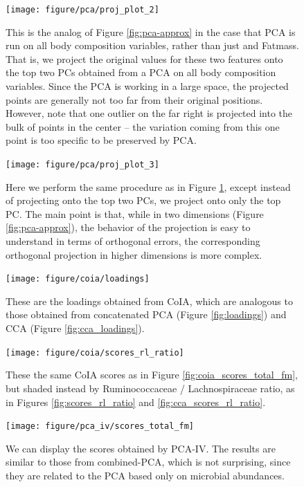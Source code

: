 \documentclass{article}
\begin{document}
\begin{figure}
  \texttt{[image: figure/pca/proj\_plot\_2]}
  \caption{This is the analog of Figure \ref{fig:pca-approx} in the case that
    PCA is run on all body composition variables, rather than just  and
    Fatmass. That is, we project the original values for these two features
    onto the top two PCs obtained from a PCA on all body composition variables.
    Since the PCA is working in a large space, the projected points are
    generally not too far from their original positions. However, note that one
    outlier on the far right is projected into the bulk of points in the center
    -- the variation coming from this one point is too specific to be preserved
    by PCA.
  \label{fig:pca-approx-2}}
\end{figure}

\begin{figure}
  \texttt{[image: figure/pca/proj\_plot\_3]}
  \caption{Here we perform the same procedure as in Figure
    \ref{fig:pca-approx-2}, except instead of projecting onto the top two PCs,
    we project onto only the top PC. The main point is that, while in two
    dimensions (Figure \ref{fig:pca-approx}), the behavior of the projection is
    easy to understand in terms of orthogonal errors, the corresponding
    orthogonal projection in higher dimensions is more complex.
  \label{fig:pca-approx-3}}
\end{figure}

\begin{figure}[ht]
  \centering \texttt{[image: figure/coia/loadings]}
  \caption{These are the loadings obtained from CoIA, which are analogous to
    those obtained from concatenated PCA (Figure \ref{fig:loadings}) and CCA
    (Figure \ref{fig:cca_loadings}). \label{fig:coia_loadings} }
\end{figure}

\begin{figure}[ht]
  \centering
  \texttt{[image: figure/coia/scores\_rl\_ratio]}
  \caption{These the same CoIA scores as in Figure \ref{fig:coia_scores_total_fm},
    but shaded instead by Ruminococcaceae / Lachnospiraceae ratio, as in Figures
    \ref{fig:scores_rl_ratio} and
    \ref{fig:cca_scores_rl_ratio}. \label{fig:coia_scores_rl_ratio} }
\end{figure}

\begin{figure}[ht]
  \centering
  \texttt{[image: figure/pca\_iv/scores\_total\_fm]}
  \caption{We can display the scores obtained by PCA-IV. The results are similar
    to those from combined-PCA, which is not surprising, since they are related
    to the PCA based only on microbial
    abundances. \label{fig:pca_iv_scores_total_fm} }
\end{figure}
\end{document}
